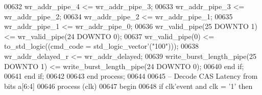 \begin{DoxyCode}
00632         \textcolor{vhdlchar}{wr_addr_pipe_4} \textcolor{vhdlchar}{<=} \textcolor{vhdlchar}{wr_addr_pipe_3};
00633         \textcolor{vhdlchar}{wr_addr_pipe_3} \textcolor{vhdlchar}{<=} \textcolor{vhdlchar}{wr_addr_pipe_2};
00634         \textcolor{vhdlchar}{wr_addr_pipe_2} \textcolor{vhdlchar}{<=} \textcolor{vhdlchar}{wr_addr_pipe_1};
00635         \textcolor{vhdlchar}{wr_addr_pipe_1} \textcolor{vhdlchar}{<=} \textcolor{vhdlchar}{wr_addr_pipe_0};
00636         \textcolor{vhdlchar}{wr_valid_pipe}\textcolor{vhdlchar}{(}\textcolor{vhdllogic}{}\textcolor{vhdllogic}{25} \textcolor{keywordflow}{DOWNTO} \textcolor{vhdllogic}{}\textcolor{vhdllogic}{1}\textcolor{vhdlchar}{)} \textcolor{vhdlchar}{<=} \textcolor{vhdlchar}{wr_valid_pipe}\textcolor{vhdlchar}{(}\textcolor{vhdllogic}{}\textcolor{vhdllogic}{24} \textcolor{keywordflow}{DOWNTO} \textcolor{vhdllogic}{}\textcolor{vhdllogic}{0}\textcolor{vhdlchar}{)};
00637         \textcolor{vhdlchar}{wr_valid_pipe}\textcolor{vhdlchar}{(}\textcolor{vhdllogic}{}\textcolor{vhdllogic}{0}\textcolor{vhdlchar}{)} \textcolor{vhdlchar}{<=} \textcolor{vhdlchar}{to\_std\_logic}\textcolor{vhdlchar}{(}\textcolor{vhdlchar}{(}\textcolor{vhdlchar}{cmd_code} \textcolor{vhdlchar}{=} \textcolor{comment}{std\_logic\_vector}\textcolor{vhdlchar}{'}\textcolor{vhdlchar}{(}\textcolor{vhdllogic}{"100"}\textcolor{vhdlchar}{)}\textcolor{vhdlchar}{)}\textcolor{vhdlchar}{)};
00638         \textcolor{vhdlchar}{wr_addr_delayed_r} \textcolor{vhdlchar}{<=} \textcolor{vhdlchar}{wr_addr_delayed};
00639         \textcolor{vhdlchar}{write_burst_length_pipe}\textcolor{vhdlchar}{(}\textcolor{vhdllogic}{}\textcolor{vhdllogic}{25} \textcolor{keywordflow}{DOWNTO} \textcolor{vhdllogic}{}\textcolor{vhdllogic}{1}\textcolor{vhdlchar}{)} \textcolor{vhdlchar}{<=} \textcolor{vhdlchar}{write_burst_length_pipe}\textcolor{vhdlchar}{(}\textcolor{vhdllogic}{}\textcolor{vhdllogic}{24} \textcolor{keywordflow}{DOWNTO} \textcolor{vhdllogic}{}\textcolor{vhdllogic}{0}\textcolor{vhdlchar}{)};
00640       \textcolor{keywordflow}{end} \textcolor{keywordflow}{if};
00641     \textcolor{keywordflow}{end} \textcolor{keywordflow}{if};
00642 
00643   \textcolor{keywordflow}{end} \textcolor{keywordflow}{process};
00644 
00645 \textcolor{keyword}{  -- Decode CAS Latency from bits a[6:4]}
00646   \textcolor{keywordflow}{process} (clk)
00647 \textcolor{vhdlkeyword}{  begin}
00648     \textcolor{keywordflow}{if} \textcolor{vhdlchar}{clk}\textcolor{vhdlchar}{'}\textcolor{vhdlkeyword}{event} \textcolor{keywordflow}{and} \textcolor{vhdlchar}{clk} \textcolor{vhdlchar}{=} \textcolor{vhdlchar}{'}\textcolor{vhdllogic}{}\textcolor{vhdllogic}{1}\textcolor{vhdlchar}{'} \textcolor{keywordflow}{then}

\end{DoxyCode}
